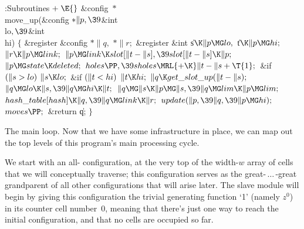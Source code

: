 \B{}:Subroutines\X${}\mathrel+\E{}$\6
\&{config} ${}{*}{}$\\{move\_up}(\&{config} ${}{*}\|p,\39{}$\&{int} \\{lo}${},%
\39{}$\&{int} \\{hi})\1\1\2\2\6
${}\{{}$\1\6
\&{register} \&{config} ${}{*}\|q,{}$ ${}{*}\|r;{}$\6
\&{register} \&{int} \|s${}\K\|p\MG\\{lo},{}$ \|t${}\K\|p\MG\\{hi};{}$\7
${}\|r\K\|p\MG\\{link};{}$\6
${}\|p\MG\\{link}\K\\{slot}[\|t-\|s],\39\\{slot}[\|t-\|s]\K\|p;{}$\6
${}\|p\MG\\{state}\K\\{deleted};{}$\6
${}\\{holes}\PP,\39\\{sholes}\MRL{+{\K}}\|t-\|s+\T{1};{}$\6
\&{if} ${}(\|s>\\{lo}){}$\1\5
${}\|s\K\\{lo};{}$\2\6
\&{if} ${}(\|t<\\{hi}){}$\1\5
${}\|t\K\\{hi};{}$\2\6
${}\|q\K\\{get\_slot\_up}(\|t-\|s);{}$\6
${}\|q\MG\\{lo}\K\|s,\39\|q\MG\\{hi}\K\|t;{}$\6
${}\|q\MG\|s\K\|p\MG\|s,\39\|q\MG\\{lim}\K\|p\MG\\{lim};{}$\6
${}\\{hash\_table}[\\{hash}]\K\|q,\39\|q\MG\\{link}\K\|r;{}$\6
${}\\{update}(\|p,\39\|q,\39\|p\MG\\{hi});{}$\6
${}\\{moves}\PP;{}$\6
\&{return} \|q;\6
\4${}\}{}$\2\par
\fi

The main loop. Now that we have some infrastructure in place,
we can map out the top levels of this program's main processing cycle.

We start with an all- configuration, at the very top of the
width-$w$ array of cells that we will conceptually traverse; this configuration
serves as the great-$\,\ldots\,$-great grandparent of all other
configurations that will arise later. The slave module will begin
by giving this configuration the trivial generating function `1' (namely
$z^0$) in its counter cell number~0, meaning that there's just one way to
reach the initial configuration, and that no cells are occupied so far.

